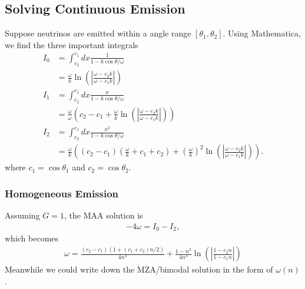 \documentclass[letterpaper,12pt,english]{sphinxmanual}
\begin{document}
\subsection{Solving Continuous Emission}
\label{\detokenize{collective/dispersion-relation:solving-continuous-emission}}
Suppose neutrinos are emitted within a angle range \([\theta_1,\theta_2]\). Using Mathematica, we find the three important integrals
\begin{equation*}
\begin{split}I_0 &= \int_{c_2 }^{c_1 } d x \frac{1}{1-k\cos\theta/\omega} \\
   &= \frac{\omega}{k} \ln \left( \left\vert\frac{\omega-c_2 k}{\omega-c_1 k} \right\vert \right) \\
I_1 &= \int_{c_2 }^{c_1 } d x \frac{x}{1-k\cos\theta/\omega} \\
& =  \frac{\omega}{\omega} \left( c_2 -c_1  +  \frac{ \omega }{k} \ln \left(\left\vert \frac{\omega-c_2 k}{\omega-c_1 k} \right\vert \right) \right) \\
I_2 &= \int_{c_2 }^{c_1 } d x \frac{x^2}{1-k\cos\theta/\omega} \\
&= \frac{\omega}{k} \left(  (c_2 -c_1 )\left(\frac{\omega}{k} + c_1 +c_2  \right) + \left(\frac{\omega}{k}\right)^2 \ln \left( \left\vert \frac{\omega-c_2 k}{\omega-c_1 k} \right\vert \right) \right).\end{split}
\end{equation*}
where \(c_1=\cos\theta_1\) and \(c_2=\cos\theta_2\).


\subsubsection{Homogeneous Emission}
\label{\detokenize{collective/dispersion-relation:homogeneous-emission}}
Assuming \(G=1\), the MAA solution is
\begin{equation*}
\begin{split}-4\omega = I_0 - I_2,\end{split}
\end{equation*}
which becomes
\label{\detokenize{collective/dispersion-relation:equation-eqn-dr-continuous-angle-range}}\begin{equation}\label{equation:collective/dispersion-relation:eqn-dr-continuous-angle-range}
\begin{split}\omega=\frac{(c_2-c_1)(1+(c_1+c_2)n/2)}{4n^3} + \frac{ 1-n^2 }{4n^3}\ln\left( \left\vert \frac{1-c_2 n}{1-c_1 n} \right\vert \right)\end{split}
\end{equation}
Meanwhile we could write down the MZA/bimodal solution in the form of \(\omega(n)\).
\end{document}
